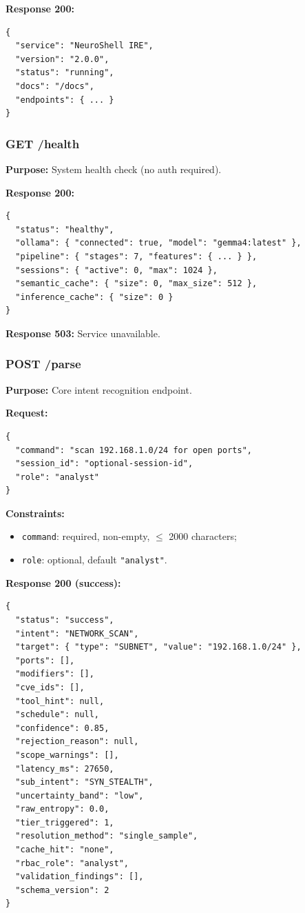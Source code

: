 \documentclass[10pt,journal,onecolumn]{IEEEtran}
\begin{document}
\textbf{Response 200:}
\begin{lstlisting}
{
  "service": "NeuroShell IRE",
  "version": "2.0.0",
  "status": "running",
  "docs": "/docs",
  "endpoints": { ... }
}
\end{lstlisting}

\subsubsection{GET /health}
\textbf{Purpose:} System health check (no auth required).

\textbf{Response 200:}
\begin{lstlisting}
{
  "status": "healthy",
  "ollama": { "connected": true, "model": "gemma4:latest" },
  "pipeline": { "stages": 7, "features": { ... } },
  "sessions": { "active": 0, "max": 1024 },
  "semantic_cache": { "size": 0, "max_size": 512 },
  "inference_cache": { "size": 0 }
}
\end{lstlisting}

\textbf{Response 503:} Service unavailable.

\subsubsection{POST /parse}
\textbf{Purpose:} Core intent recognition endpoint.

\textbf{Request:}
\begin{lstlisting}
{
  "command": "scan 192.168.1.0/24 for open ports",
  "session_id": "optional-session-id",
  "role": "analyst"
}
\end{lstlisting}

\textbf{Constraints:}
\begin{itemize}
\item \texttt{command}: required, non-empty, $\leq$ 2000 characters;
\item \texttt{role}: optional, default \texttt{"analyst"}.
\end{itemize}

\textbf{Response 200 (success):}
\begin{lstlisting}
{
  "status": "success",
  "intent": "NETWORK_SCAN",
  "target": { "type": "SUBNET", "value": "192.168.1.0/24" },
  "ports": [],
  "modifiers": [],
  "cve_ids": [],
  "tool_hint": null,
  "schedule": null,
  "confidence": 0.85,
  "rejection_reason": null,
  "scope_warnings": [],
  "latency_ms": 27650,
  "sub_intent": "SYN_STEALTH",
  "uncertainty_band": "low",
  "raw_entropy": 0.0,
  "tier_triggered": 1,
  "resolution_method": "single_sample",
  "cache_hit": "none",
  "rbac_role": "analyst",
  "validation_findings": [],
  "schema_version": 2
}
\end{lstlisting}
\end{document}
